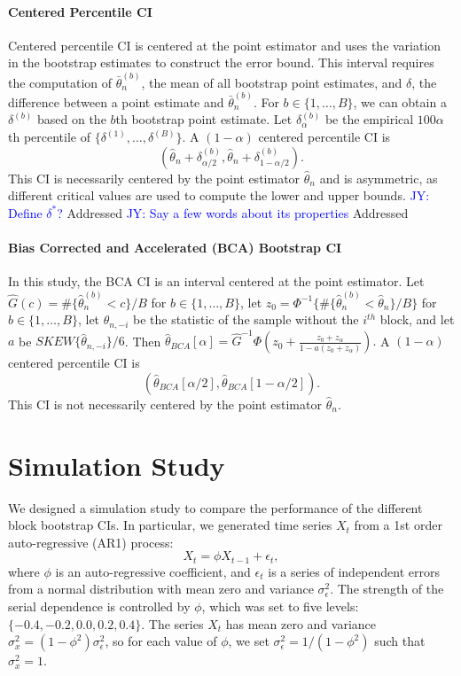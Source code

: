 \documentclass[12pt, letterpaper, titlepage]{article}
\newcommand{\jy}[1]{\textcolor{blue}{JY: #1}}
\begin{document}
\paragraph{Centered Percentile CI}
Centered percentile CI is centered at the point estimator and uses the
variation
in the bootstrap estimates to construct the error bound. This interval requires
the computation of $\bar\theta_n^{(b)}$, the mean of all bootstrap point
estimates, and $\delta$, the difference between a point estimate and
$\bar\theta_n^{(b)}$. For $b \in \{1, \ldots, B\}$, we can obtain a
$\delta^{(b)}$ based on the $b$th bootstrap point estimate. Let
$\delta_{\alpha}^{(b)}$ be the empirical $100\alpha$th percentile of
$\{\delta^{(1)}, \ldots,  \delta^{(B)}\}$.  
A $(1 - \alpha)$ centered percentile CI is
\[
(\hat{\theta}_{n} + \delta^{(b)}_{\alpha/2},
\hat{\theta}_{n} + \delta^{(b)}_{1 - \alpha/2}).
\]
This CI is necessarily centered by the point estimator $\hat\theta_n$ and is
asymmetric, as different critical values are used to compute
the lower and upper bounds.
\jy{Define $\delta^*$?} Addressed
\jy{Say a few words about its properties} Addressed


\paragraph{Bias Corrected and Accelerated (BCA) Bootstrap CI}
In this study, the BCA CI is an interval centered at the point estimator.
Let $\hat{G}(c) = \#\{\hat\theta_n^{(b)} < c\}/B$ for $b \in \{1, \ldots, B\}$, let
$z_0 = \Phi^{-1}\{\#\{\hat\theta_n^{(b)} < \hat{\theta}_n\} / B\}$ for $b \in \{1, \ldots, B\}$, let
$\hat{\theta}_{n, -i}$ be the statistic of the sample without the $i^{th}$
block, and let $a$ be $SKEW\{\hat{\theta}_{n, -i}\} / 6$. Then
 $\hat\theta_{BCA}[\alpha] = \hat{G}^{-1}\Phi(z_0 + \frac{z_{0} + z_{\alpha}}{1 - a(z_{0} + z_{\alpha})}).$
A $(1 - \alpha)$ centered percentile CI is
\[
(\hat\theta_{BCA}[\alpha/2],
\hat\theta_{BCA}[1 - \alpha/2]).
\]
This CI is not necessarily centered by the point estimator $\hat\theta_n$.

\section{Simulation Study}
\label{sec:simstudy}

We designed a simulation study to compare the performance of the different
block
bootstrap CIs. In particular, we generated time series $X_t$
from a 1st order auto-regressive (AR1) process:
\[
X_t = \phi X_{t-1} + \epsilon_t,
\]
where $\phi$ is an auto-regressive coefficient, and $\epsilon_t$ is a series of
independent errors from a normal distribution with mean zero and variance
$\sigma_{\epsilon}^2$. The strength of the serial dependence is controlled by
$\phi$, which was set to five levels: $\{-0.4, -0.2, 0.0, 0.2, 0.4\}$.
The series $X_t$ has mean zero and variance
$\sigma_x^2 = (1 - \phi^2) \sigma_{\epsilon}^2$, so for each value of $\phi$,
we
set $\sigma_{\epsilon}^2 = 1 / (1 - \phi^2)$ such that $\sigma_x^2 = 1$.
\end{document}
